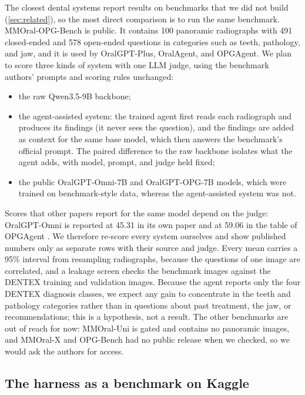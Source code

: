 The closest dental systems report results on benchmarks that we did not build (\cref{sec:related}), so the most direct
comparison is to run the same benchmark. MMOral-OPG-Bench \citep{hao2025mmoral} is public. It contains 100 panoramic
radiographs with 491 closed-ended and 578 open-ended questions in categories such as teeth, pathology, and jaw, and it is
used by OralGPT-Plus, OralAgent, and OPGAgent. We plan to score three kinds of system with one LLM judge, using the
benchmark authors' prompts and scoring rules unchanged:
\begin{itemize}[leftmargin=*,itemsep=1pt,topsep=2pt]
  \item the raw Qwen3.5-9B backbone;
  \item the agent-assisted system: the trained agent first reads each radiograph and produces its findings (it never sees
  the question), and the findings are added as context for the same base model, which then answers the benchmark's
  official prompt. The paired difference to the raw backbone isolates what the agent adds, with model, prompt, and judge
  held fixed;
  \item the public OralGPT-Omni-7B and OralGPT-OPG-7B models, which were trained on benchmark-style data, whereas
  the agent-assisted system was not.
\end{itemize}
Scores that other papers report for the same model depend on the judge: OralGPT-Omni is reported at 45.31 in its own
paper \citep{hao2025oralgptomni} and at 59.06 in the table of OPGAgent \citep{yu2026opgagent}. We therefore re-score every
system ourselves and show published numbers only as separate rows with their source and judge. Every mean carries a
95\% interval from resampling radiographs, because the questions of one image are correlated, and a leakage screen checks
the benchmark images against the DENTEX training and validation images. Because the agent reports only the four
DENTEX diagnosis classes, we expect any gain to concentrate in the teeth and pathology categories rather than in
questions about past treatment, the jaw, or recommendations; this is a hypothesis, not a result. The other benchmarks are
out of reach for now: MMOral-Uni is gated and contains no panoramic images, and MMOral-X and OPG-Bench had no public
release when we checked, so we would ask the authors for access.

\subsection{The harness as a benchmark on Kaggle}
\label{sec:kaggle}

